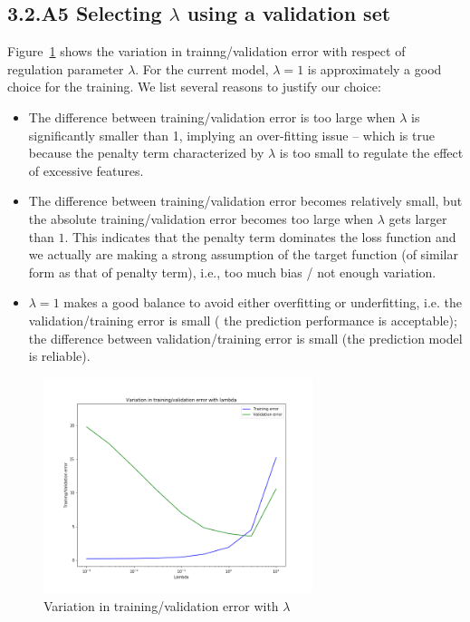 \documentclass[english,11pt]{article}
\begin{document}
\subsection*{3.2.A5 Selecting $\lambda$ using a validation set}
Figure~\ref{fig:3_2_A5} shows the variation in trainng/validation error with respect of regulation parameter $\lambda$.  For the current model, $\lambda=1$ is approximately a good choice for the training. We list several reasons to justify our choice:
\begin{itemize}
	\item The difference between training/validation error is too large when $\lambda$ is significantly smaller than 1, implying an over-fitting issue -- which is true because the penalty term characterized by $\lambda$ is too small to regulate the effect of excessive features.
	\item The difference between training/validation error becomes relatively small, but the absolute training/validation error becomes too large when $\lambda$ gets larger than $1$. This indicates that the penalty term dominates the loss function and we actually are making a strong assumption of the target function (of similar form as that of penalty term), i.e., too much bias / not enough variation. 
	\item $\lambda=1$ makes a good balance to avoid either overfitting or underfitting, i.e. the validation/training error is small ( the prediction performance is acceptable); the difference between validation/training error is small (the prediction model is reliable).
\end{itemize}
\begin{figure}[h]
\centering
\includegraphics[width=0.7\textwidth]{../hw1/part2/fig3_2_A5.png}
\caption{Variation in training/validation error with $\lambda$}
\label{fig:3_2_A5}
\end{figure}
\end{document}
